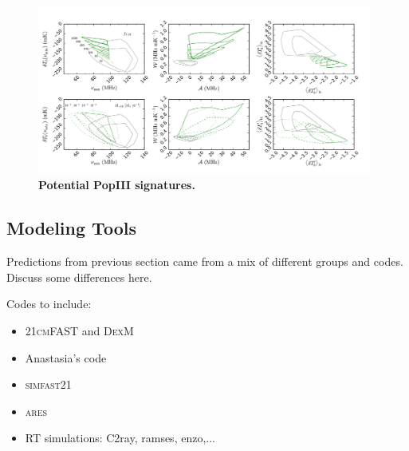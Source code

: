 \begin{figure}[]
\begin{center}
\includegraphics[width=0.98\textwidth]{Mirocha/mirocha2018_fig6.pdf}
\end{center}
\caption{{\bf Potential PopIII signatures.}}
\label{fig:popIII_gs}
\end{figure}


\subsection{Modeling Tools} \label{sec:codes}
Predictions from previous section came from a mix of different groups and codes. Discuss some differences here.

Codes to include:
\begin{itemize}
	\item \textsc{21cmFAST} and \textsc{DexM}
	\item Anastasia's code
	\item \textsc{simfast21}
	\item \textsc{ares}	
	\item RT simulations: C2ray, ramses, enzo,...
\end{itemize}






